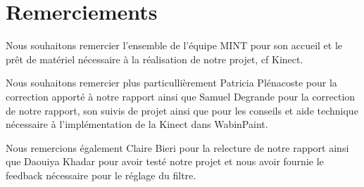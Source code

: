 \chapter*{Remerciements}

Nous souhaitons remercier l'ensemble de l'équipe MINT pour son accueil et le prêt de matériel nécessaire à la réalisation de notre projet, cf Kinect.

Nous souhaitons remercier plus particullièrement Patricia Plénacoste pour la correction apporté à notre rapport ainsi que Samuel Degrande pour la correction de notre rapport, son suivis de projet ainsi que pour les conseils et aide technique nécessaire à l'implémentation de la Kinect dans WabinPaint.

Nous remercions également Claire Bieri pour la relecture de notre rapport ainsi que Daouiya Khadar pour avoir testé notre projet et nous avoir fournie le feedback nécessaire pour le réglage du filtre.

\newpage
